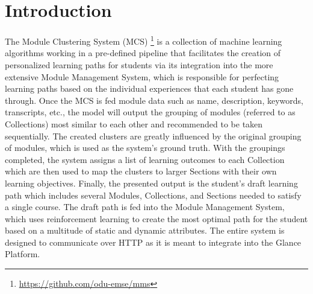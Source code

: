 \chapter{Introduction}
\label{ch:introduction}

The Module Clustering System (MCS) \footnote{\url{https://github.com/odu-emse/mms}} is a collection of machine learning algorithms working in a pre-defined pipeline that facilitates the creation of personalized learning paths for students via its integration into the more extensive Module Management System, which is responsible for perfecting learning paths based on the individual experiences that each student has gone through. Once the MCS is fed module data such as name, description, keywords, transcripts, etc., the model will output the grouping of modules (referred to as Collections) most similar to each other and recommended to be taken sequentially. The created clusters are greatly influenced by the original grouping of modules, which is used as the system's ground truth. With the groupings completed, the system assigns a list of learning outcomes to each Collection which are then used to map the clusters to larger Sections with their own learning objectives. Finally, the presented output is the student's draft learning path which includes several Modules, Collections, and Sections needed to satisfy a single course. The draft path is fed into the Module Management System, which uses reinforcement learning to create the most optimal path for the student based on a multitude of static and dynamic attributes. The entire system is designed to communicate over HTTP as it is meant to integrate into the Glance Platform. \cite{gh:glance}


